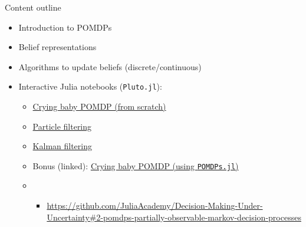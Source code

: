 \begin{frame}[fragile]{Content outline}

\begin{itemize}
    \item Introduction to POMDPs
    \item Belief representations
    \item Algorithms to update beliefs (discrete/continuous)
    \item Interactive Julia notebooks (\texttt{Pluto.jl}):
    \begin{itemize}
        \item \href{http://htmlview.glitch.me/?https://raw.githubusercontent.com/mossr/StateEstimation.jl/master/html/crying_baby_problem.html}{\color{cardinal}Crying baby POMDP (from scratch)}
        \item \href{http://htmlview.glitch.me/?https://raw.githubusercontent.com/mossr/StateEstimation.jl/master/html/particle_filter.html}{\color{cardinal}Particle filtering}
        \item \href{http://htmlview.glitch.me/?https://raw.githubusercontent.com/mossr/StateEstimation.jl/master/html/kalman_filter.html}{\color{cardinal}Kalman filtering}
        \item Bonus (linked): \href{https://htmlview.glitch.me/?https://github.com/JuliaAcademy/Decision-Making-Under-Uncertainty/blob/master/html/2-POMDPs.jl.html}{\color{cardinal}Crying baby POMDP (using \texttt{POMDPs.jl})}
        \item \begin{itemize}
            \item \url{https://github.com/JuliaAcademy/Decision-Making-Under-Uncertainty#2-pomdps-partially-observable-markov-decision-processes}
        \end{itemize}
    \end{itemize}
\end{itemize}

\end{frame}